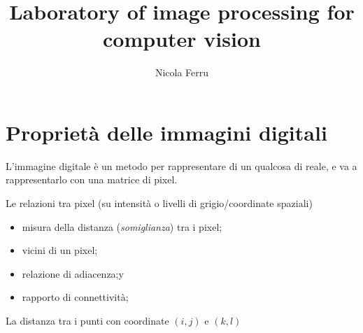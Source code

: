 \documentclass{report}
\title{Laboratory of image processing for computer vision}
\author{Nicola Ferru}
\begin{document}
\maketitle
\tableofcontents

\chapter{Proprietà delle immagini digitali}
\label{chap:propdelimmdig}

L'immagine digitale è un metodo per rappresentare di un qualcosa di
reale, e va a rappresentarlo con una matrice di pixel.

Le relazioni tra pixel (su intensità o livelli di grigio/coordinate
spaziali)
\begin{itemize}
\item misura della distanza (\textit{somiglianza}) tra i pixel;
\item vicini di un pixel; 
\item relazione di adiacenza;y
\item rapporto di connettività;
\end{itemize}
La distanza tra i punti con coordinate $(i,j)$ e $(k,l)$
\end{document}
